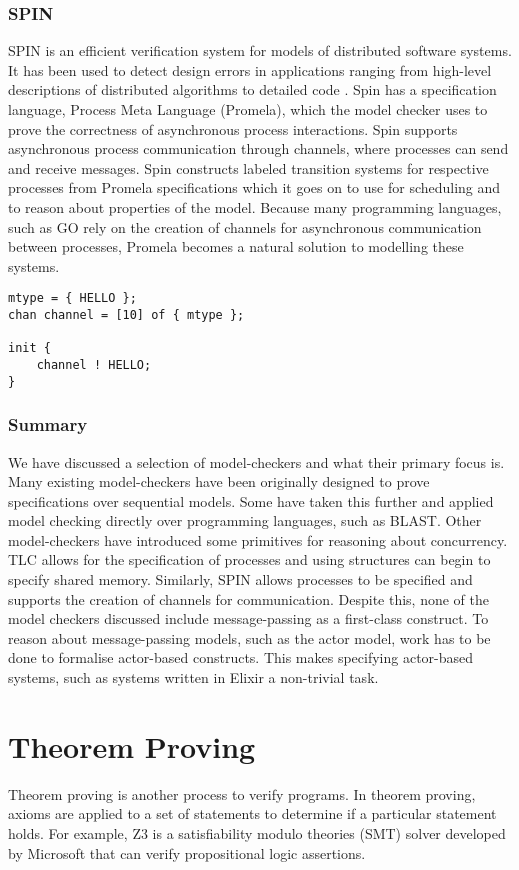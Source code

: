 \subsubsection*{\textbf{SPIN}}
SPIN is an efficient verification system for models of distributed software systems. It has been used to detect design errors in applications ranging from high-level descriptions of distributed algorithms to detailed code \cite{spin}. Spin has a specification language, Process Meta Language (Promela), which the model checker uses to prove the correctness of asynchronous process interactions. Spin supports asynchronous process communication through channels, where processes can send and receive messages. Spin constructs labeled transition systems for respective processes from Promela specifications which it goes on to use for scheduling and to reason about properties of the model. Because many programming languages, such as GO \cite{go} rely on the creation of channels for asynchronous communication between processes, Promela becomes a natural solution to modelling these systems.
\begin{lstlisting}[caption={Example of a Promela specification that enqueues a message in a channel}]
mtype = { HELLO };
chan channel = [10] of { mtype };

init {
    channel ! HELLO;
}
\end{lstlisting}

\subsubsection{Summary}
We have discussed a selection of model-checkers and what their primary focus is. Many existing model-checkers have been originally designed to prove specifications over sequential models. Some have taken this further and applied model checking directly over programming languages, such as BLAST. Other model-checkers have introduced some primitives for reasoning about concurrency. TLC allows for the specification of processes and using structures can begin to specify shared memory. Similarly, SPIN allows processes to be specified and supports the creation of channels for communication. Despite this, none of the model checkers discussed include message-passing as a first-class construct. To reason about message-passing models, such as the actor model, work has to be done to formalise actor-based constructs. This makes specifying actor-based systems, such as systems written in Elixir a non-trivial task.
\section{Theorem Proving}
Theorem proving is another process to verify programs. In theorem proving, axioms are applied to a set of statements to determine if a particular statement holds. For example, Z3 \cite{z3} is a satisfiability modulo theories (SMT) solver developed by Microsoft that can verify propositional logic assertions.

